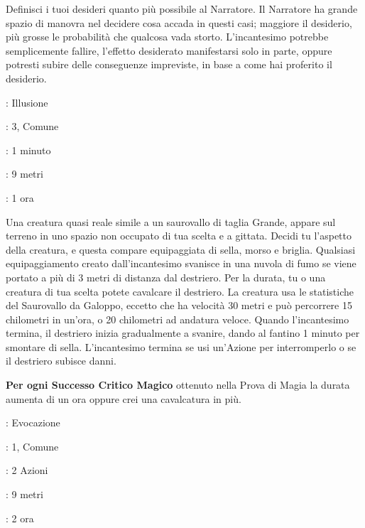 \begin{multicols}{2}
\medskip
Definisci i tuoi desideri quanto più possibile al Narratore. Il Narratore ha grande spazio di manovra nel decidere cosa accada in questi casi; maggiore il desiderio, più grosse le probabilità che qualcosa vada storto. L'incantesimo potrebbe semplicemente fallire, l'effetto desiderato manifestarsi solo in parte, oppure potresti subire delle conseguenze impreviste, in base a come hai proferito il desiderio.


\noindent\colorbox{OBSSgold!10}{
\begin{minipage}{0.95\linewidth}
\begin{description}[noitemsep, topsep=0pt, parsep=0pt, partopsep=0pt, leftmargin=0cm, labelwidth=1.3cm]
	\item[\textbf{Lista}]: Illusione
	\item[\textbf{Livello}]: 3, Comune
	\item[\textbf{Lancio}]: 1 minuto
	\item[\textbf{Gittata}]: 9 metri
	\item[\textbf{Durata}]: 1 ora
\end{description}
\end{minipage}}\smallskip

Una creatura quasi reale simile a un saurovallo di taglia Grande, appare sul terreno in uno spazio non occupato di tua scelta e a gittata. Decidi tu l'aspetto della creatura, e questa compare equipaggiata di sella, morso e briglia. Qualsiasi equipaggiamento creato dall'incantesimo svanisce in una nuvola di fumo se viene portato a più di 3 metri di distanza dal destriero. Per la durata, tu o una creatura di tua scelta potete cavalcare il destriero. La creatura usa le statistiche del Saurovallo da Galoppo, eccetto che ha velocità 30 metri e può percorrere 15 chilometri in un'ora, o 20 chilometri ad andatura veloce. Quando l'incantesimo termina, il destriero inizia gradualmente a svanire, dando al fantino 1 minuto per smontare di sella. L'incantesimo termina se usi un'Azione per interromperlo o se il destriero subisce danni.

\textbf{Per ogni Successo Critico Magico} ottenuto nella Prova di Magia la durata aumenta di un ora oppure crei una cavalcatura in più.

\noindent\colorbox{OBSSgold!10}{
\begin{minipage}{0.95\linewidth}
\begin{description}[noitemsep, topsep=0pt, parsep=0pt, partopsep=0pt, leftmargin=0cm, labelwidth=1.3cm]
	\item[\textbf{Lista}]: Evocazione
	\item[\textbf{Livello}]: 1, Comune
	\item[\textbf{Lancio}]: 2 Azioni
	\item[\textbf{Gittata}]: 9 metri
	\item[\textbf{Durata}]: 2 ora
\end{description}
\end{minipage}}\smallskip


\end{multicols}
